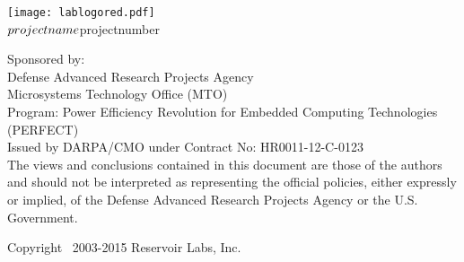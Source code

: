\documentclass[letterpaper]{book}
\begin{document}
\hypersetup{pageanchor=false,citecolor=blue}
\begin{titlepage}
\vspace*{1cm}
\begin{center}
\texttt{[image: lablogored.pdf]} \\
\vspace{-3.5cm}
{\large $projectname \\ $projectnumber }\\
\vspace*{1cm}
\vspace*{0.5cm}
\end{center}
\end{titlepage}
\clearpage
\vspace*{15.0cm}

{\small
Sponsored by: \\
Defense Advanced Research Projects Agency \\
Microsystems Technology Office (MTO) \\
Program: Power Efficiency Revolution for Embedded Computing Technologies (PERFECT) \\
Issued by DARPA/CMO under Contract No: HR0011-12-C-0123 \\

The views and conclusions contained in this document are those of the authors 
and should not be interpreted as representing the official policies, either 
expressly or implied, of the Defense Advanced Research Projects Agency or the 
U.S. Government.

Copyright \textcopyright ~2003-2015 Reservoir Labs, Inc.
}
\tableofcontents
\clearemptydoublepage
{}
\hypersetup{pageanchor=true,citecolor=blue}
\end{document}
